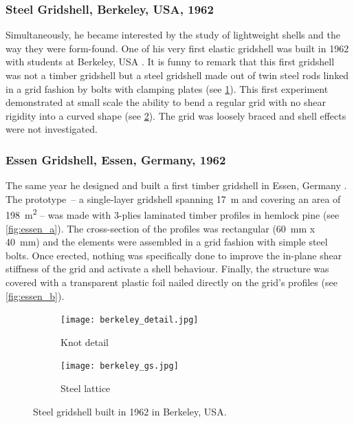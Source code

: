 
\subsubsection{Steel Gridshell, Berkeley, USA, 1962}
Simultaneously, he became interested by the study of lightweight shells and the way they were form-found. One of his very first elastic gridshell was built in 1962 with students at Berkeley, USA \cite[p.~270]{IL10}. It is funny to remark that this first gridshell was not a timber gridshell but a steel gridshell made out of twin steel rods linked in a grid fashion by bolts with clamping plates (see \cref{fig:berkeley_a}). This first experiment demonstrated at small scale the ability to bend a regular grid with no shear rigidity into a curved shape  (see \cref{fig:berkeley_b}). The grid was loosely braced and shell effects were not investigated.

\subsubsection{Essen Gridshell, Essen, Germany, 1962}
The same year he designed and built a first timber gridshell in Essen, Germany \cite[p.~272]{IL10}. The prototype~-- a single-layer gridshell spanning \SI{17}{m} and covering an area of \SI{198}{m^2} -- was made with 3-plies laminated timber profiles in hemlock pine (see \cref{fig:essen_a}). The cross-section of the profiles was rectangular (\SI{60}{mm} x \SI{40}{mm}) and the elements were assembled in a grid fashion with simple steel bolts. Once erected, nothing was specifically done to improve the in-plane shear stiffness of the grid and activate a shell behaviour. Finally, the structure was covered with a transparent plastic foil nailed directly on the grid's profiles (see \cref{fig:essen_b}).



\begin{figure}[t]
	\begin{subfigure}[b]{\TwoMediaWidth}
		\texttt{[image: berkeley\_detail.jpg]}
		\caption{Knot detail}
		\label{fig:berkeley_a}
	\end{subfigure}%
	\hspace{\MediaGutterWidth}%
	\begin{subfigure}[b]{\TwoMediaWidth}
		\texttt{[image: berkeley\_gs.jpg]}
		\caption{Steel lattice}
		\label{fig:berkeley_b}
	\end{subfigure}
	\caption[Steel gridshell built in 1962 in Berkeley, USA]{Steel gridshell built in 1962 in Berkeley, USA.}
	\label{fig:berkeley}
\end{figure}

